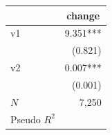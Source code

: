 \begin{tabular}{lr}
\toprule
             & \multicolumn{1}{c}{change} \\ 
\midrule
v1           &                   9.351*** \\ 
             &                    (0.821) \\ 
v2           &                   0.007*** \\ 
             &                    (0.001) \\ 
\midrule
$N$          &                      7,250 \\ 
Pseudo $R^2$ &                            \\ 
\bottomrule
\end{tabular}
